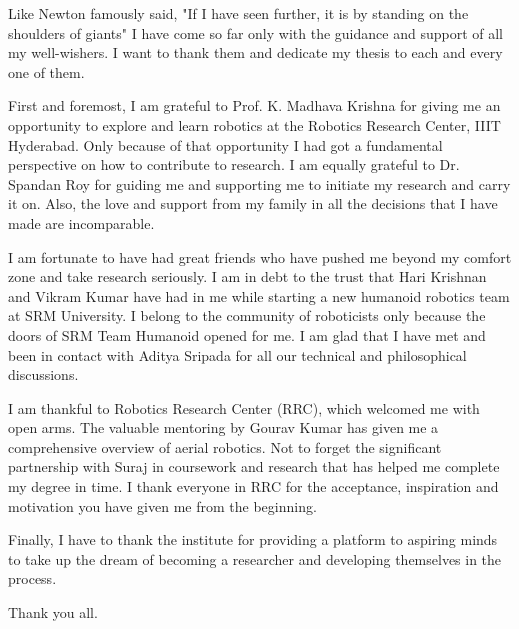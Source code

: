 Like Newton famously said, "If I have seen further, it is by standing on the shoulders of giants" I have come so far only with the guidance and support of all my well-wishers. I want to thank them and dedicate my thesis to each and every one of them.

First and foremost, I am grateful to Prof. K. Madhava Krishna for giving me an opportunity to explore and learn robotics at the Robotics Research Center, IIIT Hyderabad. Only because of that opportunity I had got a fundamental perspective on how to contribute to research. I am equally grateful to Dr. Spandan Roy for guiding me and supporting me to initiate my research and carry it on. Also, the love and support from my family in all the decisions that I have made are incomparable.

I am fortunate to have had great friends who have pushed me beyond my comfort zone and take research seriously. I am in debt to the trust that Hari Krishnan and Vikram Kumar have had in me while starting a new humanoid robotics team at SRM University. I belong to the community of roboticists only because the doors of SRM Team Humanoid opened for me. I am glad that I have met and been in contact with Aditya Sripada for all our technical and philosophical discussions.

I am thankful to Robotics Research Center (RRC), which welcomed me with open arms. The valuable mentoring by Gourav Kumar has given me a comprehensive overview of aerial robotics. Not to forget the significant partnership with Suraj in coursework and research that has helped me complete my degree in time. I thank everyone in RRC for the acceptance, inspiration and motivation you have given me from the beginning.

Finally, I have to thank the institute for providing a platform to aspiring minds to take up the dream of becoming a researcher and developing themselves in the process.

Thank you all.